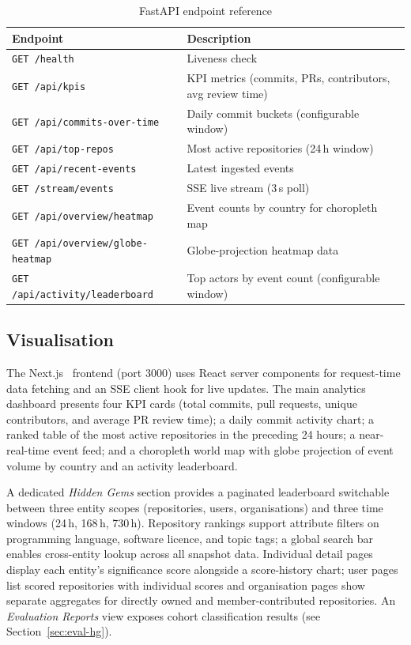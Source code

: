 \documentclass[sigconf]{acmart}
\begin{document}
\begin{table}[ht]
  \caption{FastAPI endpoint reference}
  \label{tab:endpoints}
  \begin{tabularx}{\linewidth}{l L}
    \toprule
    \textbf{Endpoint} & \textbf{Description} \\
    \midrule
    \texttt{GET /health}                        & Liveness check \\
    \texttt{GET /api/kpis}                      & KPI metrics (commits, PRs, contributors, avg review time) \\
    \texttt{GET /api/commits-over-time}         & Daily commit buckets (configurable window) \\
    \texttt{GET /api/top-repos}                 & Most active repositories (24\,h window) \\
    \texttt{GET /api/recent-events}             & Latest ingested events \\
    \texttt{GET /stream/events}                 & SSE live stream (3\,s poll) \\
    \texttt{GET /api/overview/heatmap}          & Event counts by country for choropleth map \\
    \texttt{GET /api/overview/globe-heatmap}    & Globe-projection heatmap data \\
    \texttt{GET /api/activity/leaderboard}      & Top actors by event count (configurable window) \\
    \bottomrule
  \end{tabularx}
\end{table}


\subsection{Visualisation}

The Next.js~\cite{nextjs} frontend (port 3000) uses React server components
for request-time data fetching and an SSE client hook for live updates.
The main analytics dashboard presents four KPI cards (total commits, pull
requests, unique contributors, and average PR review time); a daily commit
activity chart; a ranked table of the most active repositories in the preceding
24 hours; a near-real-time event feed; and a choropleth world map with globe
projection of event volume by country and an activity leaderboard.

A dedicated \textit{Hidden Gems} section provides a paginated leaderboard
switchable between three entity scopes (repositories, users, organisations) and
three time windows (24\,h, 168\,h, 730\,h). Repository rankings support
attribute filters on programming language, software licence, and topic tags;
a global search bar enables cross-entity lookup across all snapshot data.
Individual detail pages display each entity's significance score alongside a
score-history chart; user pages list scored repositories with individual scores
and organisation pages show separate aggregates for directly owned and
member-contributed repositories. An \textit{Evaluation Reports} view exposes
cohort classification results (see Section~\ref{sec:eval-hg}).
\end{document}
